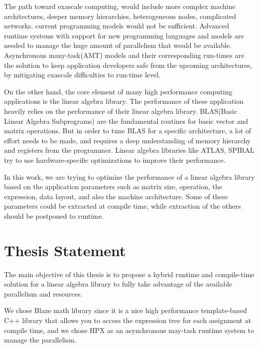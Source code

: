 The path toward exascale computing, would include more complex machine architectures, deeper memory hierarchies, heterogeneous nodes, complicated networks\cite{grubel2016using}.  current programming models would not be sufficient. Advanced runtime systems with support for new programming languages and models are needed to manage the huge amount of parallelism that would be available\cite{kaiser2014hpx}.
Asynchronous many-task(AMT) models and their corresponding run-times are the solution to keep application developers safe from the upcoming architectures, by mitigating exascale difficulties to run-time level\cite{bennett2015asynchronous}.

On the other hand, the core element of many high performance computing applications is the linear algebra library. The performance of these application heavily relies on the performance of their linear algebra library. BLAS(Basic Linear Algebra Subprograms) are the fundamental routines for basic vector and matrix operations. But in order to tune BLAS for a specific architecture, a lot of effort needs to be made, and requires a deep understanding of memory hierarchy and registers from the programmer\cite{whaley1998automatically}. 
Linear algebra libraries like ATLAS\cite{whaley1998automatically}, SPIRAL\cite{puschel2005spiral} try to use hardware-specific optimizations to improve their performance.


In this work, we are trying to optimize the performance of a linear algebra library based on the application parameters such as matrix size, operation, the expression, data layout, and also the machine architecture. Some of these parameters could be extracted at compile time, while extraction of the others should be postponed to runtime.


\vspace{\baselineskip}
\section{Thesis Statement}
The main objective of this thesis is to propose a hybrid runtime and compile-time solution for a linear algebra library to fully take advantage of the available parallelism and resources. 

We chose Blaze math library since it is a nice high performance template-based C++ library that allows you to access the expression tree for each assignment at compile time, and we chose HPX as an asynchronous may-task runtime system to manage the parallelism. 

